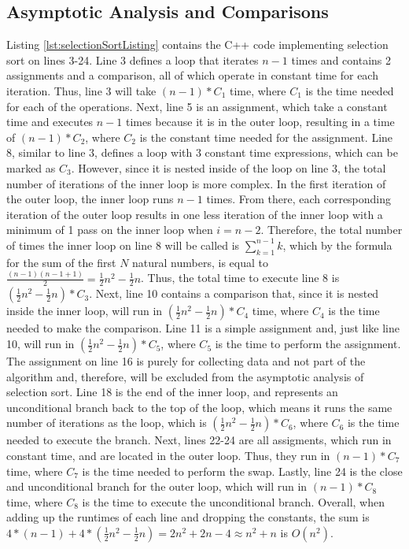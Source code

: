 \documentclass[letterpaper, 10pt,DIV=13]{scrartcl}
\numberwithin{equation}{section} %
\numberwithin{figure}{section} %
\numberwithin{table}{section} %
\begin{document}
\subsection{Asymptotic Analysis and Comparisons}\label{selectionAnalysis}
Listing \ref{lst:selectionSortListing} contains the C++ code implementing selection sort on lines 3-24. Line 3 defines a loop that iterates $n - 1$ times and contains 2 assignments and a comparison, all of which operate in constant time for each iteration. Thus, line 3 will take $(n - 1) * C_{1}$ time, where $C_{1}$ is the time needed for each of the operations. Next, line 5 is an assignment, which take a constant time and executes $n - 1$ times because it is in the outer loop, resulting in a time of $(n - 1) * C_{2}$, where $C_{2}$ is the constant time needed for the assignment. Line 8, similar to line 3, defines a loop with 3 constant time expressions, which can be marked as $C_{3}$. However, since it is nested inside of the loop on line 3, the total number of iterations of the inner loop is more complex. In the first iteration of the outer loop, the inner loop runs $n - 1$ times. From there, each corresponding iteration of the outer loop results in one less iteration of the inner loop with a minimum of 1 pass on the inner loop when $i = n - 2$. Therefore, the total number of times the inner loop on line 8 will be called is $\sum_{k = 1} ^{n - 1} k$, which by the formula for the sum of the first $N$ natural numbers, is equal to $\frac{(n - 1)(n - 1 + 1)}{2} = \frac{1}{2}n^2 - \frac{1}{2}n$. Thus, the total time to execute line 8 is $(\frac{1}{2}n^2 - \frac{1}{2}n) * C_{3}$. Next, line 10 contains a comparison that, since it is nested inside the inner loop, will run in $(\frac{1}{2}n^2 - \frac{1}{2}n) * C_{4}$ time, where $C_{4}$ is the time needed to make the comparison. Line 11 is a simple assignment and, just like line 10, will run in $(\frac{1}{2}n^2 - \frac{1}{2}n) * C_{5}$, where $C_{5}$ is the time to perform the assignment. The assignment on line 16 is purely for collecting data and not part of the algorithm and, therefore, will be excluded from the asymptotic analysis of selection sort. Line 18 is the end of the inner loop, and represents an unconditional branch back to the top of the loop, which means it runs the same number of iterations as the loop, which is $(\frac{1}{2}n^2 - \frac{1}{2}n) * C_{6}$, where $C_{6}$ is the time needed to execute the branch. Next, lines 22-24 are all assigments, which run in constant time, and are located in the outer loop. Thus, they run in $(n - 1) * C_{7}$ time, where $C_{7}$ is the time needed to perform the swap. Lastly, line 24 is the close and unconditional branch for the outer loop, which will run in $(n - 1) * C_{8}$ time, where $C_{8}$ is the time to execute the unconditional branch. Overall, when adding up the runtimes of each line and dropping the constants, the sum is $4 * (n - 1) + 4 * (\frac{1}{2}n^2 - \frac{1}{2}n) = 2n^2 + 2n - 4 \approx n^2 + n$ is $O(n^2)$.
\end{document}
